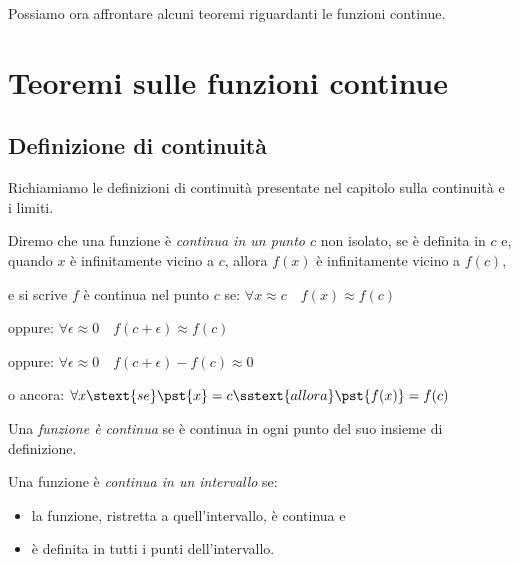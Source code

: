 Possiamo ora affrontare alcuni teoremi riguardanti le funzioni continue.

\section{Teoremi sulle funzioni continue}
\label{sec:cont_continuita}

\subsection{Definizione di continuità}
\label{sec:cont_definizione}

Richiamiamo le definizioni di continuità presentate nel capitolo sulla 
continuità e i limiti.

\begin{newdef}{}{}
Diremo che una funzione è \emph{continua in un punto \(c\)} non isolato, 
se è definita in \(c\) e, 
quando \(x\) è infinitamente vicino a \(c\), 
allora \(f(x)\) è infinitamente vicino a \(f(c)\), 

\vspace{.5em}
e si scrive \(f\) è continua nel punto \(c\) se: \hspace{5mm}
\(\forall x \approx c \quad f(x) \approx f(c)\)

oppure: \hspace{51mm}
\(\forall \epsilon \approx 0 \quad f(c + \epsilon) \approx f(c)\)

oppure: \hspace{51mm}
\(\forall \epsilon \approx 0 \quad f(c + \epsilon) - f(c) \approx 0\)

o ancora: \hspace{49mm}
\(\forall x \stext{se } \pst{x} = c \sstext{allora} \pst{f(x)} = f(c)\)
\end{newdef}

\begin{newdef}{}{}
Una \emph{funzione è continua} se è continua in ogni punto del suo 
insieme di definizione.
\end{newdef}

\begin{newdef}{}{}
Una funzione è \emph{continua in un intervallo} se:
\begin{itemize} [noitemsep]
\item 
la funzione, ristretta a quell'intervallo, è continua e
\item 
è definita in tutti i punti dell'intervallo.
\end{itemize}
\end{newdef}

